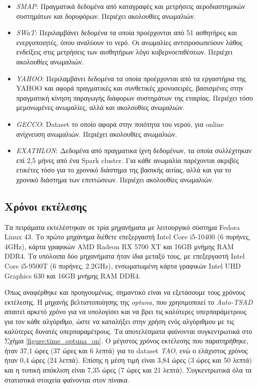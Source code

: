 \begin{itemize}
    \item \emph{SMAP}: Πραγματικά δεδομένα από καταγραφές και μετρήσεις αεροδιαστημικών συστημάτων και δορυφόρων. Περιέχει ακολουθίες ανωμαλιών.
    \item \emph{SWaT}: Περιλαμβάνει δεδομένα τα οποία προέρχονται από 51 ασθητήρες και ενεργοποιητές, όπου αναλύουν το νερό. Οι ανωμαλίες αντιπροσωπεύουν λάθος ενδείξεις στις μετρήσεις των αισθητήρων λόγο κυβερνοεπιθέσεων. Περιέχει ακολουθίες ανωμαλιών.
    \item \emph{YAHOO}: Περιλαμβάνει δεδομένα τα οποία προέρχονται από τα εργαστήρια της YAHOO και αφορά πραγματικές και συνθετικές χρονοσειρές, βασισμένες στην πραγματική κίνηση παραγωγής διάφορων συστημάτων της εταιρίας. Περιέχει τόσο μεμονωμένες ανωμαλίες, αλλά και ακολουθίες ανωμαλιών.
    \item \emph{GECCO}: Dataset το οποίο αφορά στην ποιότητα του νερού, για online ανίχνευση ανωμαλιών. Περιέχει ακολουθίες ανωμαλιών.
    \item \emph{EXATHLON}: Δεδομένα από πραγματικα ίχνη δεδομένων, τα οποία συλλέχτηκαν επί 2,5 μήνες από ένα Spark cluster. Για κάθε ανωμαλία παρέχονται ακριβές ετικέτες τόσο για το χρονικό διάστημα της βασικής αιτίας, αλλά και για το χρονικό διάστημα των επιπτώσεων. Περιέχει ακολουθίες ανωμαλιών.
\end{itemize}
\subsection{Χρόνοι εκτέλεσης}
Τα πειράματα εκτελέστηκαν σε τρία μηχανήματα με λειτουργικό σύστημα Fedora Linux 43. Το πρώτο μηχάνημα διέθετε επεξεργαστή Intel Core i5-10400 (6 πυρήνες, 4GHz), κάρτα γραφικών AMD Radeon RX 5700 XT και 16GB μνήμης RAM DDR4. Τα υπόλοιπα δύο μηχανήματα ήταν ίδια μεταξύ τους, με επεξεργαστή Intel Core i5-9500T (6 πυρήνες, 2.2GHz), ενσωματωμένη κάρτα γραφικών Intel UHD Graphics 630 και 16GB μνήμης RAM DDR4.

Όπως αναφέρθηκε και προηγουμένως, σημαντικό είναι να εξετάσουμε τους χρόνους εκτέλεσης. Η μηχανής βελτιστοποίησης της \emph{optuna}, που χρησιμοποιεί το \emph{Auto-TSAD} απαιτεί αρκετό χρόνο για να υπολογίσει και να βρει τις καλύτερες υπερπαράμετρους για τον κάθε αλγόριθμο, ώστε να καταλήξει στην χρήση ενός αλγόριθμου με τις καλύτερες δυνατές υπερπαραμέτρους. Τα αποτελέσματα φαίνονται συγκεντρωτικά στο Σχήμα \ref{figure:time_optuna_on}. Ο μέγιστος χρόνος εκτέλεσης που παρατηρήθηκε, ήταν 37,1 ώρες (37 ώρες και 6 λεπτά) για το dataset \emph{TAO}, ενώ ο ελάχιστος χρόνος ήταν 0,4 ώρες (24 λετπά). Επίσης η μέση τιμή είναι 3,84 ώρες (3 ώρες και 50 λεπτά) και η τυπική απόκλιση είναι 7,35 ώρες (7 ώρες και 21 λεπτά). Συγκεντρωτικά όλα τα στατιστικά στοιχεία φαίνονται στον πίνακα.

